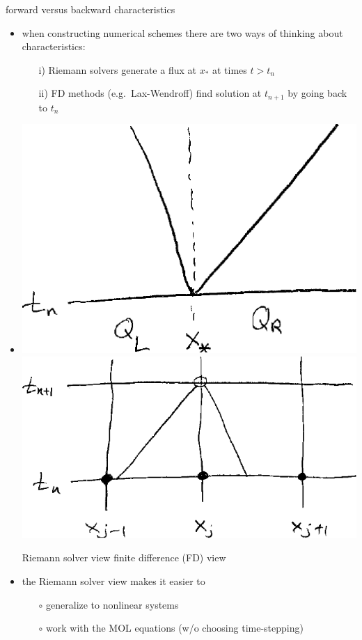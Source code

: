 \documentclass[10pt,dvipsnames,usepdftitle=false,
hyperref={pdftitle = {Finite volume methods},
    pdfauthor = {Ed Bueler}}]{beamer}
\begin{document}
\begin{frame}{forward versus backward characteristics}

\begin{itemize}
\item when constructing numerical schemes there are two ways of thinking about characteristics:
    \begin{itemize}
    \item[i)] Riemann solvers generate a flux at $x_*$ at times $t>t_n$
    \item[ii)] FD methods (e.g.~Lax-Wendroff) find solution at $t_{n+1}$ by going back to $t_n$
    \end{itemize}
\item 

\medskip

\includegraphics[height=0.34\textheight]{figs/rscharssketch} \hfill \includegraphics[height=0.38\textheight]{figs/fdcharssketch}

\medskip
\qquad Riemann solver view \hfill finite difference (FD) view \qquad \phantom{x}

\item the Riemann solver view makes it easier to
    \begin{itemize}
    \item[$\circ$] generalize to nonlinear systems
    \item[$\circ$] work with the MOL equations (w/o choosing time-stepping)
    \end{itemize}
\end{itemize}
\end{frame}
\end{document}
